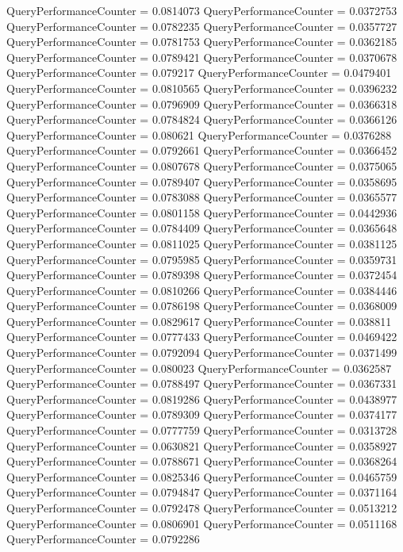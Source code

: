 \documentclass[9pt]{article}
\theoremstyle{plain}
\theoremstyle{definition}
\theoremstyle{remark}
\numberwithin{equation}{section}
\begin{document}
QueryPerformanceCounter  =  0.0814073
QueryPerformanceCounter  =  0.0372753
QueryPerformanceCounter  =  0.0782235
QueryPerformanceCounter  =  0.0357727
QueryPerformanceCounter  =  0.0781753
QueryPerformanceCounter  =  0.0362185
QueryPerformanceCounter  =  0.0789421
QueryPerformanceCounter  =  0.0370678
QueryPerformanceCounter  =  0.079217
QueryPerformanceCounter  =  0.0479401
QueryPerformanceCounter  =  0.0810565
QueryPerformanceCounter  =  0.0396232
QueryPerformanceCounter  =  0.0796909
QueryPerformanceCounter  =  0.0366318
QueryPerformanceCounter  =  0.0784824
QueryPerformanceCounter  =  0.0366126
QueryPerformanceCounter  =  0.080621
QueryPerformanceCounter  =  0.0376288
QueryPerformanceCounter  =  0.0792661
QueryPerformanceCounter  =  0.0366452
QueryPerformanceCounter  =  0.0807678
QueryPerformanceCounter  =  0.0375065
QueryPerformanceCounter  =  0.0789407
QueryPerformanceCounter  =  0.0358695
QueryPerformanceCounter  =  0.0783088
QueryPerformanceCounter  =  0.0365577
QueryPerformanceCounter  =  0.0801158
QueryPerformanceCounter  =  0.0442936
QueryPerformanceCounter  =  0.0784409
QueryPerformanceCounter  =  0.0365648
QueryPerformanceCounter  =  0.0811025
QueryPerformanceCounter  =  0.0381125
QueryPerformanceCounter  =  0.0795985
QueryPerformanceCounter  =  0.0359731
QueryPerformanceCounter  =  0.0789398
QueryPerformanceCounter  =  0.0372454
QueryPerformanceCounter  =  0.0810266
QueryPerformanceCounter  =  0.0384446
QueryPerformanceCounter  =  0.0786198
QueryPerformanceCounter  =  0.0368009
QueryPerformanceCounter  =  0.0829617
QueryPerformanceCounter  =  0.038811
QueryPerformanceCounter  =  0.0777433
QueryPerformanceCounter  =  0.0469422
QueryPerformanceCounter  =  0.0792094
QueryPerformanceCounter  =  0.0371499
QueryPerformanceCounter  =  0.080023
QueryPerformanceCounter  =  0.0362587
QueryPerformanceCounter  =  0.0788497
QueryPerformanceCounter  =  0.0367331
QueryPerformanceCounter  =  0.0819286
QueryPerformanceCounter  =  0.0438977
QueryPerformanceCounter  =  0.0789309
QueryPerformanceCounter  =  0.0374177
QueryPerformanceCounter  =  0.0777759
QueryPerformanceCounter  =  0.0313728
QueryPerformanceCounter  =  0.0630821
QueryPerformanceCounter  =  0.0358927
QueryPerformanceCounter  =  0.0788671
QueryPerformanceCounter  =  0.0368264
QueryPerformanceCounter  =  0.0825346
QueryPerformanceCounter  =  0.0465759
QueryPerformanceCounter  =  0.0794847
QueryPerformanceCounter  =  0.0371164
QueryPerformanceCounter  =  0.0792478
QueryPerformanceCounter  =  0.0513212
QueryPerformanceCounter  =  0.0806901
QueryPerformanceCounter  =  0.0511168
QueryPerformanceCounter  =  0.0792286
\end{document}
